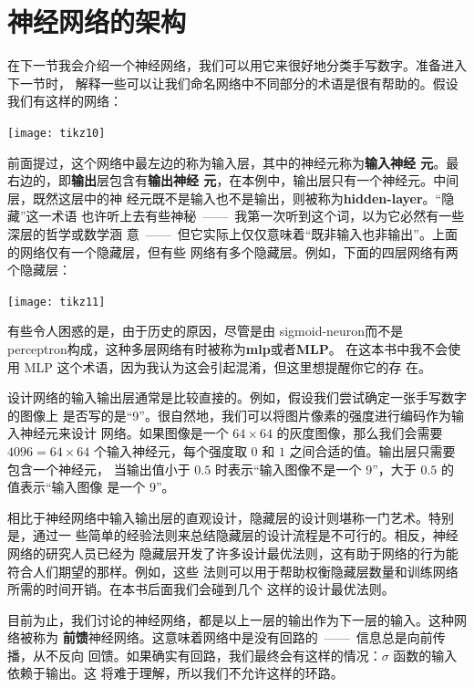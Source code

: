 \section{神经网络的架构}

在下一节我会介绍一个神经网络，我们可以用它来很好地分类手写数字。准备进入下一节时，
解释一些可以让我们命名网络中不同部分的术语是很有帮助的。假设我们有这样的网络：
\begin{center}
  \texttt{[image: tikz10]}
\end{center}

前面提过，这个网络中最左边的称为输入层，其中的神经元称为\textbf{输入神经
  元}。最右边的，即\textbf{输出}层包含有\textbf{输出神经
  元}，在本例中，输出层只有一个神经元。中间层，既然这层中的神
经元既不是输入也不是输出，则被称为\textbf{\gls{hidden-layer}}。“隐藏”这一术语
也许听上去有些神秘~——~我第一次听到这个词，以为它必然有一些深层的哲学或数学涵
意~——~但它实际上仅仅意味着“既非输入也非输出”。上面的网络仅有一个隐藏层，但有些
网络有多个隐藏层。例如，下面的四层网络有两个隐藏层：
\begin{center}
  \texttt{[image: tikz11]}
\end{center}

有些令人困惑的是，由于历史的原因，尽管是由 \gls*{sigmoid-neuron}而不是%
\gls*{perceptron}构成，这种多层网络有时被称为\textbf{\gls{mlp}}或者\textbf{MLP}。
在这本书中我不会使用 MLP 这个术语，因为我认为这会引起混淆，但这里想提醒你它的存
在。

设计网络的输入输出层通常是比较直接的。例如，假设我们尝试确定一张手写数字的图像上
是否写的是“9”。很自然地，我们可以将图片像素的强度进行编码作为输入神经元来设计
网络。如果图像是一个 $64 \times 64$ 的灰度图像，那么我们会需要 $4096 = 64 \times
64$ 个输入神经元，每个强度取 $0$ 和 $1$ 之间合适的值。输出层只需要包含一个神经元，
当输出值小于 $0.5$ 时表示“输入图像不是一个 $9$”，大于 $0.5$ 的值表示“输入图像
是一个 $9$”。

相比于神经网络中输入输出层的直观设计，隐藏层的设计则堪称一门艺术。特别是，通过一
些简单的经验法则来总结隐藏层的设计流程是不可行的。相反，神经网络的研究人员已经为
隐藏层开发了许多设计最优法则，这有助于网络的行为能符合人们期望的那样。例如，这些
法则可以用于帮助权衡隐藏层数量和训练网络所需的时间开销。在本书后面我们会碰到几个
这样的设计最优法则。

目前为止，我们讨论的神经网络，都是以上一层的输出作为下一层的输入。这种网络被称为
\textbf{前馈}神经网络。这意味着网络中是没有回路的~——~信息总是向前传播，从不反向
回馈。如果确实有回路，我们最终会有这样的情况：$\sigma$ 函数的输入依赖于输出。这
将难于理解，所以我们不允许这样的环路。

